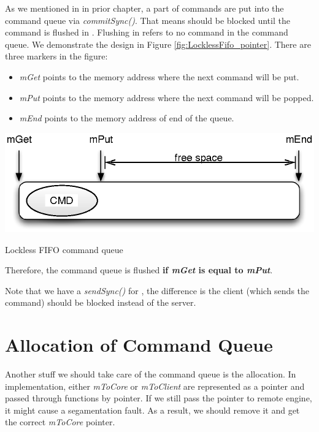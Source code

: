 As we mentioned in in prior chapter, a part of commands are put into the command queue via \textit{commitSync()}. That means \Client{} should be blocked until the command is flushed in \Core{}. Flushing in \RS{} refers to no command in the command queue. We demonstrate the design in Figure \ref{fig:LocklessFifo_pointer}. There are three markers in the figure:
\begin{itemize}
\item\textit{mGet} points to the memory address where the next command will be put.
\item\textit{mPut} points to the memory address where the next command will be popped.
\item\textit{mEnd} points to the memory address of end of the queue.
\end{itemize}
\begin{center-figure}
	\includegraphics[scale=0.8]{fig/LocklessFifo_pointer.eps}
	\caption{Lockless FIFO command queue}
	\label{fig:LocklessFifo_pointer}
\end{center-figure}

Therefore, the command queue is flushed \textbf{if \textit{mGet} is equal to \textit{mPut}}.

Note that we have a \textit{sendSync()} for \RRS{}, the difference is the client (which sends the command) should be blocked instead of the server.

\section{Allocation of Command Queue}
\label{s:rsListeningThread}
Another stuff we should take care of the command queue is the allocation. In \RS{} implementation, either \textit{mToCore} or \textit{mToClient} are represented as a pointer and passed through functions by pointer. If we still pass the pointer to remote engine, it might cause a segamentation fault. As a result, we should remove it and get the correct \textit{mToCore} pointer.

